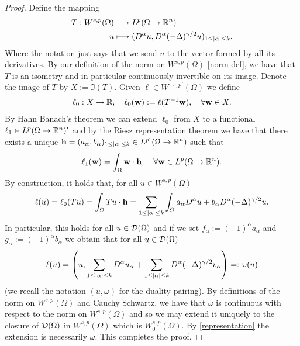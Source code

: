 \documentclass[12pt]{article}
\theoremstyle{definition}
\begin{document}
\begin{proof}
  Define the mapping
  \begin{align*}
    T: W^{s,p}(\Omega ) & \longrightarrow L^p(\Omega \to \mathbb{R}^n)                                                   \\
    u                   & \longmapsto(D^\alpha u, D^\alpha (-\Delta )^{\gamma /2} u)_{1 \leq\left| \alpha \right|\leq k}.
  \end{align*}
  Where the notation just says that we send $u$ to the vector formed by all its derivatives. By our definition of the norm on $W^{s,p}(\Omega )$ \eqref{norm def}, we have that $T$ is an isometry and in particular continuously invertible on its image. Denote the image of $T$ by $X:=\Im(T)$. Given $\ell \in W^{-s,p'}(\Omega )$ we define
  \begin{align*}
    \ell_0: X \to \mathbb{R}, \quad \ell_0(\vb{w}):= \ell(T^{-1}\vb{w}), \quad \forall \vb{w} \in X.
  \end{align*}
  By Hahn Banach's theorem we can extend $\ell_0$ from $X$ to a functional $\ell_1 \in  L^p(\Omega \to \mathbb{R}^n)'$ and by the Riesz representation theorem we have that there exists a unique $\vb{h}=(a_\alpha, b_\alpha)_{1\leq \left| \alpha \right|\leq k }\in L^{p'}(\Omega \to \mathbb{R}^n)$ such that
  \begin{align*}
    \ell_1(\vb{w})=\int_{\Omega}\vb{w}\cdot \vb{h}, \quad \forall \vb{w} \in L^p(\Omega \to \mathbb{R}^n).
  \end{align*}
  By construction, it holds that, for all $u \in W^{s,p}(\Omega )$
  \begin{align*}
    \ell(u)=\ell_0(Tu)=\int_{\Omega}Tu\cdot \vb{h}=\sum_{1\leq\left| \alpha \right|\leq k}\int_{\Omega}a_\alpha D^\alpha u  +b_\alpha D^\alpha (-\Delta )^{\gamma /2}u.
  \end{align*}
  In particular, this holds for all $u \in \mathcal{D}(\Omega )$ and if we set $f_\alpha:=(-1)^\alpha a_\alpha$ and $g_\alpha:=(-1)^\alpha b_\alpha$ we obtain that for all $u \in \mathcal{D}(\Omega )$
  \begin{align}\label{representation}
    \ell(u)=\left(u,\sum_{1\leq\left| \alpha \right|\leq k} D^\alpha u_\alpha+ \sum_{1\leq\left| \alpha \right|\leq k} D^\alpha (-\Delta )^{\gamma /2}v_\alpha\right)=: \omega(u)
  \end{align}
  (we recall the notation $(u,\omega)$ for the duality pairing). By definitions of the norm on $W^{s,p}(\Omega )$ and Cauchy Schwartz, we have that $\omega$ is continuous with respect to the norm on $W^{s,p}(\Omega )$ and so we may extend it uniquely to the closure of $\mathcal{D}(\Omega )$ in $W^{s,p}(\Omega )$ which is $W^{s,p}_0(\Omega )$. By \eqref{representation} the extension is necessarily $\omega$. This completes the proof.
\end{proof}
\end{document}
